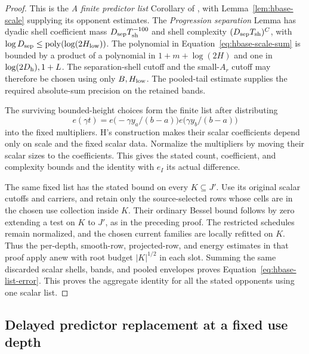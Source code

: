 \begin{proof}
This is the \emph{A finite predictor list} Corollary of
\cite[Section~5]{H}, with Lemma~\ref{lem:hbase-scale} supplying its
opponent estimates.  The \emph{Progression separation} Lemma has
dyadic shell coefficient mass \(D_{\rm sep}T_{\rm sh}^{-100}\) and
shell complexity \((D_{\rm sep}T_{\rm sh})^C\), with
\(\log D_{\rm sep}\le\operatorname{poly}(\log(2H_{\rm low}))\).
The polynomial in Equation~\eqref{eq:hbase-scale-sum} is bounded by
a product of a polynomial in \(1+m+\log(2H)\) and one in
\(\log(2D_{\rm h}),1+L\).  The separation-shell cutoff and the
small-\(A_r\) cutoff may therefore be chosen using only
\(B,H_{\rm low}\).  The pooled-tail estimate supplies the required
absolute-sum precision on the retained bands.

The surviving bounded-height choices form the finite list after
distributing
\[
 e(\gamma t)
  =e\bigl(-\gamma y_a/(b-a)\bigr)
   e\bigl(\gamma y_b/(b-a)\bigr)
\]
into the fixed multipliers.  H's construction makes their scalar
coefficients depend only on scale and the fixed scalar data.
Normalize the multipliers by moving their scalar sizes to the
coefficients.  This gives the stated count, coefficient, and
complexity bounds and the identity with \(e_I\) its actual
difference.

The same fixed list has the stated bound on every \(K\subseteq J'\).
Use its original scalar cutoffs and carriers, and retain only the
source-selected rows whose cells are in the chosen use collection
inside \(K\).  Their ordinary Bessel bound follows by zero extending
a test on \(K\) to \(J'\), as in the preceding proof.  The restricted
schedules remain normalized, and the chosen current families are
locally refitted on \(K\).  Thus the per-depth, smooth-row, projected-row,
and energy estimates in that proof apply anew with root budget
\(|K|^{1/2}\) in each slot.  Summing the same discarded scalar
shells, bands, and pooled envelopes proves
Equation~\eqref{eq:hbase-list-error}.  This proves the aggregate
identity for all the stated opponents using one scalar list.
\end{proof}

\subsection{Delayed predictor replacement at a fixed use depth}

